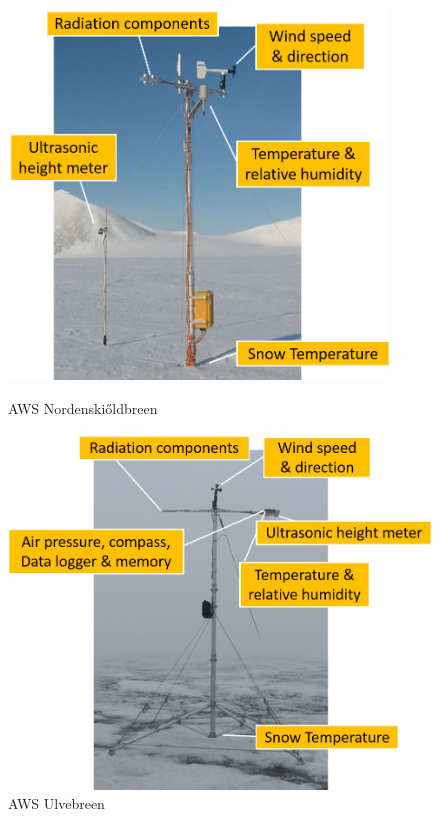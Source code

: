 \documentclass[11pt]{report}
\begin{document}
\begin{figure}[h]
\raggedright
\begin{minipage}{0.5\textwidth}
\centering{}
    \includegraphics[width=0.9\textwidth]{nski1.jpg}
    \caption{AWS Nordenski\H{o}ldbreen \cite{uuproj}}
    \label{fig:instrn}
\end{minipage}%
\begin{minipage}{0.5\textwidth}
\centering{}
    \includegraphics[width=1.05\textwidth]{ulve1.jpg}
    \caption{AWS Ulvebreen \cite{uuproj}}
    \label{fig:instru}
\end{minipage}%
\end{figure}
\end{document}
